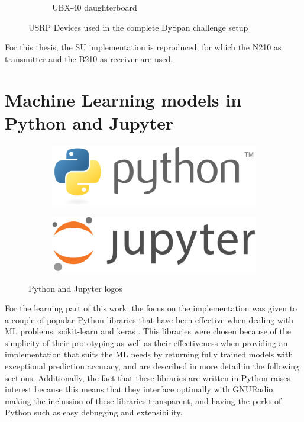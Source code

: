 \begin{figure}[htb]
\begin{subfigure}[htb]{0.4\textwidth}
        \caption{UBX-40 daughterboard}
        \label{fig:UBX}
    \end{subfigure}
    \caption{\ac{USRP} Devices used in the complete DySpan challenge setup}
    \label{fig:ettus}
\end{figure}

For this thesis, the \ac{SU} implementation is reproduced, for which the N210 as transmitter and the B210 as receiver are used.

\section{Machine Learning models in Python and Jupyter}
\begin{figure}[!h]
    \centering
    \begin{subfigure}[htb]{0.45\textwidth}
        \centering
        \includegraphics[width=\linewidth]{figures/python_logo}
        \label{fig:python}
    \end{subfigure}
    \begin{subfigure}[htb]{0.45\textwidth}
        \centering
        \includegraphics[width=\linewidth]{figures/jupyter_logo}
        \label{fig:jupyter}
    \end{subfigure}
    \caption{Python and Jupyter logos}
    \label{fig:python_jupyter}
\end{figure}
For the learning part of this work, the focus on the implementation was given to a couple of popular Python libraries that have been effective when dealing with \ac{ML} problems: scikit-learn \cite{SKLEARN} and keras \cite{KERAS}. This libraries were chosen because of the simplicity of their prototyping as well as their effectiveness when providing an implementation that suits the \ac{ML} needs by returning fully trained models with exceptional prediction accuracy, and are described in more detail in the following sections. Additionally, the fact that these libraries are written in Python raises interest because this means that they interface optimally with GNURadio, making the inclussion of these libraries transparent, and having the perks of Python such as easy debugging and extensibility.\\

